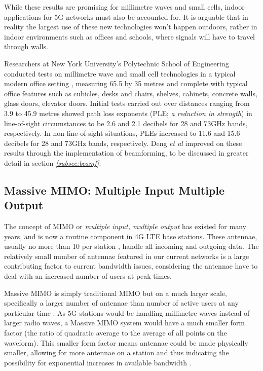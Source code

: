 \documentclass[journal]{IEEEtran}
\begin{document}
While these results are promising for millimetre waves and small cells, indoor applications for 5G networks must also be accounted for. It is arguable that in reality the largest use of these new technologies won't happen outdoors, rather in indoor environments such as offices and schools, where signals will have to travel through walls. 

Researchers at New York University's Polytechnic School of Engineering conducted tests on millimetre wave and small cell technologies in a typical modern office setting \cite{28_73ghz}, measuring 65.5 by 35 metres and complete with typical office features such as cubicles, desks and chairs, shelves, cabinets, concrete walls, glass doors, elevator doors. Initial tests carried out over distances ranging from 3.9 to 45.9 metres showed path loss exponents (PLE; \textit{a reduction in strength}) in line-of-sight circumstances to be 2.6 and 2.1 decibels for 28 and 73GHz bands, respectively. In non-line-of-sight situations, PLEs increased to 11.6 and 15.6 decibels for 28 and 73GHz bands, respectively. Deng \textit{et al} improved on these results through the implementation of beamforming, to be discussed in greater detail in section \textit{\ref{subsec:beamf}}.

\subsection{Massive MIMO: Multiple Input Multiple Output}
The concept of MIMO or \textit{multiple input, multiple output} has existed for many years, and is now a routine component in 4G LTE base stations. These antennae, usually no more than 10 per station \cite{mimo}, handle all incoming and outgoing data. The relatively small number of antennae featured in our current networks is a large contributing factor to current bandwidth issues, considering the antennae have to deal with an increased number of users at peak times.

Massive MIMO is simply traditional MIMO but on a much larger scale, specifically a larger number of antennae than number of active users at any particular time \cite{whatwill5gbe}. As 5G stations would be handling millimetre waves instead of larger radio waves, a Massive MIMO system would have a much smaller form factor (the ratio of quadratic average to the average of all points on the waveform). This smaller form factor means antennae could be made physically smaller, allowing for more antennae on a station and thus indicating the possibility for exponential increases in available bandwidth \cite{mimo}.
\end{document}
